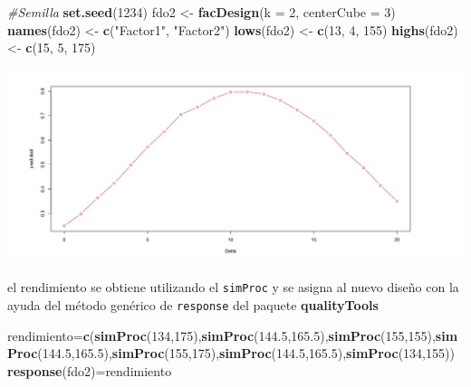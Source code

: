 \documentclass[
]{book}
\newenvironment{Shaded}{\begin{snugshade}}{\end{snugshade}}
\newcommand{\AttributeTok}[1]{\textcolor[rgb]{0.13,0.29,0.53}{#1}}
\newcommand{\CommentTok}[1]{\textcolor[rgb]{0.56,0.35,0.01}{\textit{#1}}}
\newcommand{\DecValTok}[1]{\textcolor[rgb]{0.00,0.00,0.81}{#1}}
\newcommand{\FloatTok}[1]{\textcolor[rgb]{0.00,0.00,0.81}{#1}}
\newcommand{\FunctionTok}[1]{\textcolor[rgb]{0.13,0.29,0.53}{\textbf{#1}}}
\newcommand{\NormalTok}[1]{#1}
\newcommand{\OtherTok}[1]{\textcolor[rgb]{0.56,0.35,0.01}{#1}}
\newcommand{\StringTok}[1]{\textcolor[rgb]{0.31,0.60,0.02}{#1}}
\begin{document}
\begin{Shaded}
\begin{Highlighting}[]
\CommentTok{\#Semilla}
\FunctionTok{set.seed}\NormalTok{(}\DecValTok{1234}\NormalTok{)}
\NormalTok{fdo2 }\OtherTok{\textless{}{-}} \FunctionTok{facDesign}\NormalTok{(}\AttributeTok{k =} \DecValTok{2}\NormalTok{, }\AttributeTok{centerCube =} \DecValTok{3}\NormalTok{)}
\FunctionTok{names}\NormalTok{(fdo2) }\OtherTok{\textless{}{-}} \FunctionTok{c}\NormalTok{(}\StringTok{"Factor1"}\NormalTok{, }\StringTok{"Factor2"}\NormalTok{)}
\FunctionTok{lows}\NormalTok{(fdo2) }\OtherTok{\textless{}{-}} \FunctionTok{c}\NormalTok{(}\DecValTok{13}\NormalTok{, }\DecValTok{4}\NormalTok{, }\DecValTok{155}\NormalTok{)}
\FunctionTok{highs}\NormalTok{(fdo2) }\OtherTok{\textless{}{-}} \FunctionTok{c}\NormalTok{(}\DecValTok{15}\NormalTok{, }\DecValTok{5}\NormalTok{, }\DecValTok{175}\NormalTok{)}
\end{Highlighting}
\end{Shaded}

\includegraphics[width=7.29167in,height=\textheight]{graficos/dario.jpg}

el rendimiento se obtiene utilizando el \texttt{simProc} y se asigna al nuevo diseño con la
ayuda del método genérico de \texttt{response} del paquete \textbf{qualityTools}

\begin{Shaded}
\begin{Highlighting}[]
\NormalTok{rendimiento}\OtherTok{=}\FunctionTok{c}\NormalTok{(}\FunctionTok{simProc}\NormalTok{(}\DecValTok{134}\NormalTok{,}\DecValTok{175}\NormalTok{),}\FunctionTok{simProc}\NormalTok{(}\FloatTok{144.5}\NormalTok{,}\FloatTok{165.5}\NormalTok{),}\FunctionTok{simProc}\NormalTok{(}\DecValTok{155}\NormalTok{,}\DecValTok{155}\NormalTok{),}\FunctionTok{simProc}\NormalTok{(}\FloatTok{144.5}\NormalTok{,}\FloatTok{165.5}\NormalTok{),}\FunctionTok{simProc}\NormalTok{(}\DecValTok{155}\NormalTok{,}\DecValTok{175}\NormalTok{),}\FunctionTok{simProc}\NormalTok{(}\FloatTok{144.5}\NormalTok{,}\FloatTok{165.5}\NormalTok{),}\FunctionTok{simProc}\NormalTok{(}\DecValTok{134}\NormalTok{,}\DecValTok{155}\NormalTok{))}
\FunctionTok{response}\NormalTok{(fdo2)}\OtherTok{=}\NormalTok{rendimiento}
\end{Highlighting}
\end{Shaded}
\end{document}
